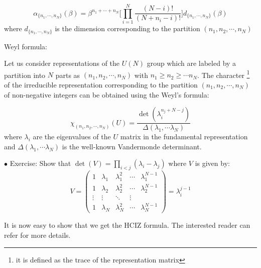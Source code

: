 \documentclass[11pt]{article}
\begin{document}
\begin{equation}
	\alpha_{\{n_1, \cdots, n_{N}\}}(\beta) = \beta^{n_1 + \cdots + n_N} \Bigg[ 
		\prod_{i=1}^{N} \frac{(N-i)!}{(N+n_i-i)!}\Bigg]  d_{\{n_1, \cdots, n_{N}\}}(\beta) 
\end{equation}
where $d_{\{n_1, \cdots, n_{N}\}}$ is the dimension corresponding to the partition
$(n_1, n_2, \cdots , n_N )$





Weyl formula:

Let us consider representations of the $U(N)$ group which are
labeled by a partition into $N$ parts as $(n_1, n_2, \cdots , n_N )$ with $ n_1 \ge n_2 \ge \cdots n_N$. The character \footnote{it is defined as the trace of the representation matrix} of the irreducible representation corresponding to the partition $(n_1, n_2, \cdots , n_N )$ of non-negative integers can be obtained using the Weyl's formula:

\begin{equation}
	\chi_{(n_1, n_2, \cdots , n_N )}(U) = \frac{\det (\lambda_{i}^{n_j + N - j})}{\Delta(\lambda_1, \cdots \lambda_N)}
\end{equation}
where $\lambda_i$ are the eigenvalues of the $U$ matrix in the fundamental representation and $\Delta(\lambda_1, \cdots \lambda_N)$ is the well-known 
Vandermonde determinant. 






\begin{mdframed}[backgroundcolor=blue!3] 
	\textsc{} 
	$\bullet$ Exercise: Show that $\det(V) = \prod_{i<j} (\lambda_i - \lambda_j)$ where $V$ is given by: 
	\begin{equation*}
		V = 
		\begin{pmatrix}
			1 & \lambda_1 & \lambda_{1}^{2} & \cdots & \lambda_{1}^{N-1} \\
			1 & \lambda_2 & \lambda_{2}^{2} & \cdots & \lambda_{2}^{N-1} \\ 
			\vdots  & \vdots  & \ddots & \vdots  \\
			1 & \lambda_N & \lambda_{N}^{2} & \cdots & \lambda_{N}^{N-1} 
		\end{pmatrix} = \lambda_{i}^{j-1} 
	\end{equation*}
	
\end{mdframed} 



It is now easy to show that we get the HCIZ formula. The interested reader can refer  \cite{Balantekin:2000vn} for more details. 
\end{document}
